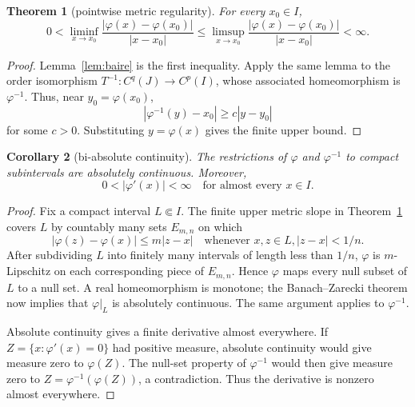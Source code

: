 \documentclass[11pt]{article}
\newtheorem{theorem}{Theorem}
\newtheorem{corollary}[theorem]{Corollary}
\begin{document}
\begin{theorem}[pointwise metric regularity]\label{thm:metric}
For every \(x_0\in I\),
\[
 0<\liminf_{x\to x_0}
 \frac{|\varphi(x)-\varphi(x_0)|}{|x-x_0|}
 \le
 \limsup_{x\to x_0}
 \frac{|\varphi(x)-\varphi(x_0)|}{|x-x_0|}<\infty.
\]
\end{theorem}

\begin{proof}
Lemma~\ref{lem:baire} is the first inequality.  Apply the same lemma to the
order isomorphism \(T^{-1}:C^q(J)\to C^p(I)\), whose associated homeomorphism
is \(\varphi^{-1}\).  Thus, near \(y_0=\varphi(x_0)\),
\[
 |\varphi^{-1}(y)-x_0|\ge c|y-y_0|
\]
for some \(c>0\).  Substituting \(y=\varphi(x)\) gives the finite upper
bound.
\end{proof}

\begin{corollary}[bi-absolute continuity]\label{cor:ac}
The restrictions of \(\varphi\) and \(\varphi^{-1}\) to compact
subintervals are absolutely continuous.  Moreover,
\[
 0<|\varphi'(x)|<\infty
 \quad\text{for almost every }x\in I.
\]
\end{corollary}

\begin{proof}
Fix a compact interval \(L\Subset I\).  The finite upper metric slope in
Theorem~\ref{thm:metric} covers \(L\) by countably many sets \(E_{m,n}\) on
which
\[
 |\varphi(z)-\varphi(x)|\le m|z-x|
 \quad\text{whenever }x,z\in L, |z-x|<1/n.
\]
After subdividing \(L\) into finitely many intervals of length less than
\(1/n\), \(\varphi\) is \(m\)-Lipschitz on each corresponding piece of
\(E_{m,n}\).  Hence \(\varphi\) maps every null subset of \(L\) to a null
set.  A real homeomorphism is monotone; the Banach--Zarecki theorem
\cite{royden} now implies that \(\varphi|_L\) is absolutely continuous.
The same argument applies to \(\varphi^{-1}\).

Absolute continuity gives a finite derivative almost everywhere.  If
\(Z=\{x:\varphi'(x)=0\}\) had positive measure, absolute continuity would
give measure zero to \(\varphi(Z)\).  The null-set property of
\(\varphi^{-1}\) would then give measure zero to
\(Z=\varphi^{-1}(\varphi(Z))\), a contradiction.  Thus the derivative is
nonzero almost everywhere.
\end{proof}
\end{document}
